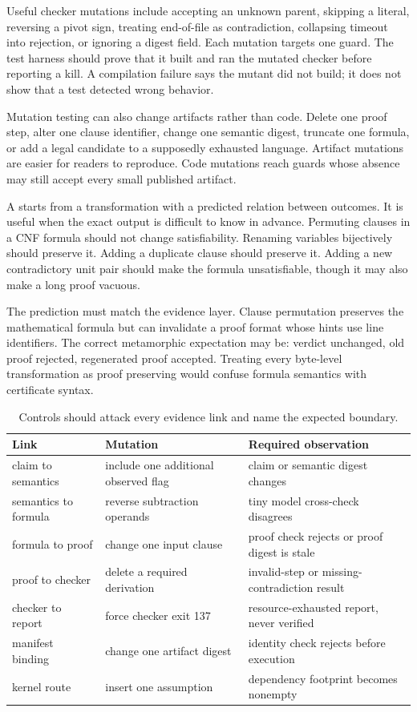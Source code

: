 Useful checker mutations include accepting an unknown parent, skipping a
literal, reversing a pivot sign, treating end-of-file as contradiction,
collapsing timeout into rejection, or ignoring a digest field. Each mutation
targets one guard. The test harness should prove that it built and ran the
mutated checker before reporting a kill. A compilation failure says the
mutant did not build; it does not show that a test detected wrong behavior.

Mutation testing can also change artifacts rather than code. Delete one proof
step, alter one clause identifier, change one semantic digest, truncate one
formula, or add a legal candidate to a supposedly exhausted language.
Artifact mutations are easier for readers to reproduce. Code mutations reach
guards whose absence may still accept every small published artifact.

A  starts from a transformation with a predicted
relation between outcomes. It is useful when the exact output is difficult to
know in advance. Permuting clauses in a CNF formula should not change
satisfiability. Renaming variables bijectively should preserve it. Adding a
duplicate clause should preserve it. Adding a new contradictory unit pair
should make the formula unsatisfiable, though it may also make a long proof
vacuous.

The prediction must match the evidence layer. Clause permutation preserves
the mathematical formula but can invalidate a proof format whose hints use
line identifiers. The correct metamorphic expectation may be: verdict
unchanged, old proof rejected, regenerated proof accepted. Treating every
byte-level transformation as proof preserving would confuse formula semantics
with certificate syntax.

\begin{table}[htbp]
\centering
\caption{Controls should attack every evidence link and name the expected
boundary.}
\begin{tabular}{@{}p{}p{}p{}@{}}
\toprule
Link & Mutation & Required observation \\
\midrule
claim to semantics & include one additional observed flag & claim or semantic digest changes \\
semantics to formula & reverse subtraction operands & tiny model cross-check disagrees \\
formula to proof & change one input clause & proof check rejects or proof digest is stale \\
proof to checker & delete a required derivation & invalid-step or missing-contradiction result \\
checker to report & force checker exit 137 & resource-exhausted report, never verified \\
manifest binding & change one artifact digest & identity check rejects before execution \\
kernel route & insert one assumption & dependency footprint becomes nonempty \\
\bottomrule
\end{tabular}
\label{tab:evidence-control-matrix}
\end{table}

